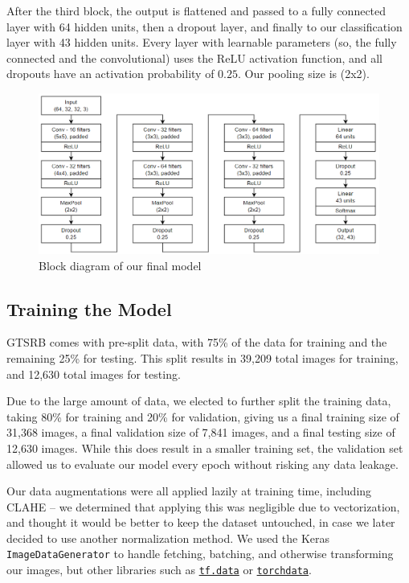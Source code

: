 \documentclass[10pt,twocolumn,letterpaper]{article}
\begin{document}
After the third block, the output is flattened and passed to a fully connected layer with 64 hidden units, then a dropout layer, and finally to our classification layer with 43 hidden units. Every layer with learnable parameters (so, the fully connected and the convolutional) uses the ReLU activation function, and all dropouts have an activation probability of $0.25$. Our pooling size is (2x2). 

\begin{figure}
\includegraphics[width=14cm]{model-diagram}
\centering
\caption{Block diagram of our final model }
\label{fig:model}
\end{figure}

\subsection{Training the Model}
GTSRB comes with pre-split data, with 75\% of the data for training and the remaining 25\% for testing. This split results in 39,209 total images for training, and 12,630 total images for testing. 

Due to the large amount of data, we elected to further split the training data, taking 80\% for training and 20\% for validation, giving us a final training size of 31,368 images, a final validation size of 7,841 images, and a final testing size of 12,630 images. While this does result in a smaller training set, the validation set allowed us to evaluate our model every epoch without risking any data leakage. 

Our data augmentations were all applied lazily at training time, including CLAHE -- we determined that applying this was negligible due to vectorization, and thought it would be better to keep the dataset untouched, in case we later decided to use another normalization method. We used the Keras \texttt{ImageDataGenerator} to handle fetching, batching, and otherwise transforming our images, but other libraries such as \href{https://www.tensorflow.org/guide/data}{\texttt{tf.data}} or \href{https://pytorch.org/data/beta/index.html}{\texttt{torchdata}}. 
\end{document}
